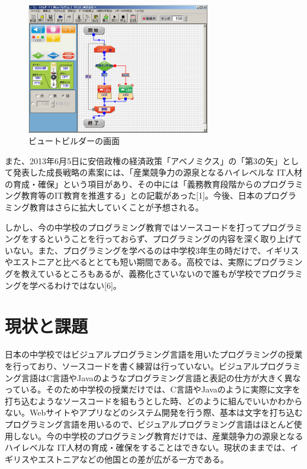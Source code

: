 \documentclass[openany,11pt,papersize]{jsbook}
\begin{document}
\begin{figure}[H]
\begin{center}
\includegraphics[width=8cm, bb=0 0 1006 770]{img/BeautoBuilderP_SSs.png}
\end{center}
\caption{ビュートビルダーの画面}
\end{figure}
また、2013年6月5日に安倍政権の経済政策「アベノミクス」の「第3の矢」として発表した成長戦略の素案には、「産業競争力の源泉となるハイレベルな IT人材の育成・確保」という項目があり、その中には「義務教育段階からのプログラミング教育等のIT教育を推進する」との記載があった[1]。今後、日本のプログラミング教育はさらに拡大していくことが予想される。

しかし、今の中学校のプログラミング教育ではソースコードを打ってプログラミングをするということを行っておらず、プログラミングの内容を深く取り上げていない。また、プログラミングを学べるのは中学校3年生の時だけで、イギリスやエストニアと比べるととても短い期間である。高校では、実際にプログラミングを教えているところもあるが、義務化さていないので誰もが学校でプログラミングを学べるわけではない[6]。

\section{現状と課題}
日本の中学校ではビジュアルプログラミング言語を用いたプログラミングの授業を行っており、ソースコードを書く練習は行っていない。ビジュアルプログラミング言語はC言語やJavaのようなプログラミング言語と表記の仕方が大きく異なっている。そのため中学校の授業だけでは、C言語やJavaのように実際に文字を打ち込むようなソースコードを組もうとした時、どのように組んでいいかわからない。Webサイトやアプリなどのシステム開発を行う際、基本は文字を打ち込むプログラミング言語を用いるので、ビジュアルプログラミング言語はほとんど使用しない。今の中学校のプログラミング教育だけでは、産業競争力の源泉となるハイレベルな IT人材の育成・確保をすることはできない。現状のままでは、イギリスやエストニアなどの他国との差が広がる一方である。
\end{document}
